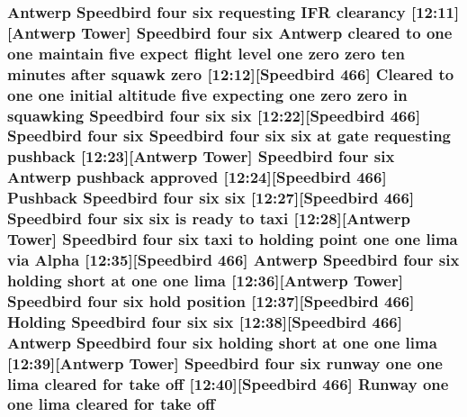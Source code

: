 \subsubsection[{\texorpdfstring{off}{off}}]{\setlength{\rightskip}{0pt plus 5cm}Antwerp Speedbird four {\bf six} requesting I\+FR clearancy \mbox{[}12\+:11\mbox{]}\mbox{[}Antwerp {\bf Tower}\mbox{]} Speedbird four {\bf six} Antwerp cleared to {\bf one} {\bf one} maintain five expect flight level {\bf one} {\bf zero} {\bf zero} {\bf ten} minutes after squawk {\bf zero} \mbox{[}12\+:12\mbox{]}\mbox{[}Speedbird 466\mbox{]} Cleared to {\bf one} {\bf one} initial altitude five expecting {\bf one} {\bf zero} {\bf zero} in {\bf squawking} Speedbird four {\bf six} {\bf six} \mbox{[}12\+:22\mbox{]}\mbox{[}Speedbird 466\mbox{]} Speedbird four {\bf six} Speedbird four {\bf six} {\bf six} at gate requesting pushback \mbox{[}12\+:23\mbox{]}\mbox{[}Antwerp {\bf Tower}\mbox{]} Speedbird four {\bf six} Antwerp pushback {\bf approved} \mbox{[}12\+:24\mbox{]}\mbox{[}Speedbird 466\mbox{]} Pushback Speedbird four {\bf six} {\bf six} \mbox{[}12\+:27\mbox{]}\mbox{[}Speedbird 466\mbox{]} Speedbird four {\bf six} {\bf six} is ready to taxi \mbox{[}12\+:28\mbox{]}\mbox{[}Antwerp {\bf Tower}\mbox{]} Speedbird four {\bf six} taxi to holding point {\bf one} {\bf one} {\bf lima} via {\bf Alpha} \mbox{[}12\+:35\mbox{]}\mbox{[}Speedbird 466\mbox{]} Antwerp Speedbird four {\bf six} holding short at {\bf one} {\bf one} {\bf lima} \mbox{[}12\+:36\mbox{]}\mbox{[}Antwerp {\bf Tower}\mbox{]} Speedbird four {\bf six} hold {\bf position} \mbox{[}12\+:37\mbox{]}\mbox{[}Speedbird 466\mbox{]} Holding Speedbird four {\bf six} {\bf six} \mbox{[}12\+:38\mbox{]}\mbox{[}Speedbird 466\mbox{]} Antwerp Speedbird four {\bf six} holding short at {\bf one} {\bf one} {\bf lima} \mbox{[}12\+:39\mbox{]}\mbox{[}Antwerp {\bf Tower}\mbox{]} Speedbird four {\bf six} runway {\bf one} {\bf one} {\bf lima} cleared for take off \mbox{[}12\+:40\mbox{]}\mbox{[}Speedbird 466\mbox{]} {\bf Runway} {\bf one} {\bf one} {\bf lima} cleared for take off}\hypertarget{happyDay5ExpectedATC_8txt_a7b8077b12b6ec60aa98491cebd72fdca}{}\label{happyDay5ExpectedATC_8txt_a7b8077b12b6ec60aa98491cebd72fdca}

